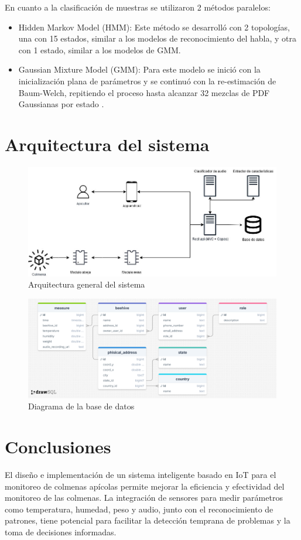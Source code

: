 \documentclass[journal]{IEEEtran} %
\begin{document}
En cuanto a la clasificación de muestras se utilizaron 2 métodos paralelos:
\begin{itemize}
\item Hidden Markov Model (HMM): Este método se desarrolló con 2 topologías, una con 15 estados, similar a los modelos de reconocimiento del habla, y otra con 1 estado, similar a los modelos de GMM.
\item Gaussian Mixture Model (GMM): Para este modelo se inició con la inicialización plana de parámetros y se continuó con la re-estimación de Baum-Welch, repitiendo el proceso hasta alcanzar 32 mezclas de PDF Gaussianas por estado \cite{TheIAAC} \cite{Zgank2019BeeService}.
\end{itemize}

\section{Arquitectura del sistema}

\begin{figure}[h]
    \centering
    \includegraphics[width=\linewidth]{arquitectura_sistema}
    \caption{Arquitectura general del sistema}
\end{figure}

\begin{figure}[h]
    \centering
    \includegraphics[width=\linewidth]{diagrama_er}
    \caption{Diagrama de la base de datos}
\end{figure}

\section{Conclusiones}

El diseño e implementación de un sistema inteligente basado en IoT para el monitoreo de colmenas apícolas permite mejorar la eficiencia y efectividad del monitoreo de las colmenas. La integración de sensores para medir parámetros como temperatura, humedad, peso y audio, junto con el reconocimiento de patrones, tiene potencial para facilitar la detección temprana de problemas y la toma de decisiones informadas.

\printbibliography[title={REFERENCIAS}]
\end{document}
